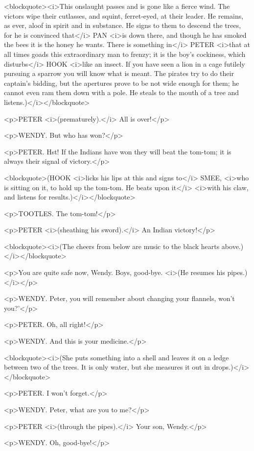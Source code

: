 <blockquote><i>This onslaught passes and is gone like a fierce wind. The victors wipe their cutlasses, and squint, ferret-eyed, at their leader. He remains, as ever, aloof in spirit and in substance. He signs to them to descend the trees, for he is convinced that</i> PAN <i>is down there, and though he has smoked the bees it is the honey he wants. There is something in</i> PETER <i>that at all times goads this extraordinary man to frenzy; it is the boy's cockiness, which disturbs</i> HOOK <i>like an insect. If you have seen a lion in a cage futilely pursuing a sparrow you will know what is meant. The pirates try to do their captain's bidding, but the apertures prove to be not wide enough for them; he cannot even ram them down with a pole. He steals to the mouth of a tree and listens.)</i></blockquote>

<p>PETER <i>(prematurely).</i> All is over!</p>

<p>WENDY. But who has won?</p>

<p>PETER. Hst! If the Indians have won they will beat the tom-tom; it is always their signal of victory.</p>

<blockquote>(HOOK <i>licks his lips at this and signs to</i> SMEE, <i>who is sitting on it, to hold up the tom-tom. He beats upon it</i> <i>with his claw, and listens for results.)</i></blockquote>

<p>TOOTLES. The tom-tom!</p>

<p>PETER <i>(sheathing his sword).</i> An Indian victory!</p>

<blockquote><i>(The cheers from below are music to the black hearts above.)</i></blockquote>

<p>You are quite safe now, Wendy. Boys, good-bye. <i>(He resumes his pipes.)</i></p>

<p>WENDY. Peter, you will remember about changing your flannels, won't you?'</p>

<p>PETER. Oh, all right!</p>

<p>WENDY. And this is your medicine.</p>

<blockquote><i>(She puts something into a shell and leaves it on a ledge between two of the trees. It is only water, but she measures it out in drops.)</i></blockquote>

<p>PETER. I won't forget.</p>

<p>WENDY. Peter, what are you to me?</p>

<p>PETER <i>(through the pipes).</i> Your son, Wendy.</p>

<p>WENDY. Oh, good-bye!</p>

